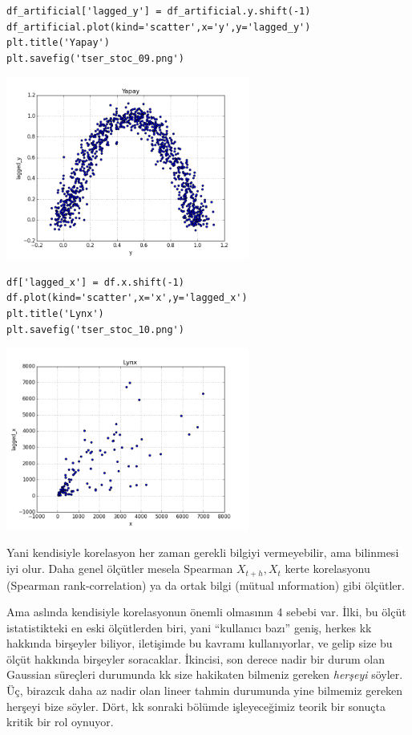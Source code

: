 \documentclass[12pt,fleqn]{article}\usepackage{../../common}
\begin{document}
\begin{verbatim}
df_artificial['lagged_y'] = df_artificial.y.shift(-1)
df_artificial.plot(kind='scatter',x='y',y='lagged_y')
plt.title('Yapay')
plt.savefig('tser_stoc_09.png')
\end{verbatim}

\includegraphics[height=6cm]{tser_stoc_09.png}

\begin{verbatim}
df['lagged_x'] = df.x.shift(-1)
df.plot(kind='scatter',x='x',y='lagged_x')
plt.title('Lynx')
plt.savefig('tser_stoc_10.png')
\end{verbatim}

\includegraphics[height=6cm]{tser_stoc_10.png}

Yani kendisiyle korelasyon her zaman gerekli bilgiyi vermeyebilir, ama bilinmesi
iyi olur. Daha genel ölçütler mesela Spearman $X_{t+h},X_t$ kerte korelasyonu
(Spearman rank-correlation) ya da ortak bilgi (mütual ınformation) gibi
ölçütler.

Ama aslında kendisiyle korelasyonun önemli olmasının 4 sebebi var. İlki, bu
ölçüt istatistikteki en eski ölçütlerden biri, yani ``kullanıcı bazı'' geniş,
herkes kk hakkında birşeyler biliyor, iletişimde bu kavramı kullanıyorlar, ve
gelip size bu ölçüt hakkında birşeyler soracaklar. İkincisi, son derece nadir
bir durum olan Gaussian süreçleri durumunda kk size hakikaten bilmeniz gereken
{\em herşeyi} söyler. Üç, birazcık daha az nadir olan lineer tahmin durumunda
yine bilmemiz gereken herşeyi bize söyler. Dört, kk sonraki bölümde
işleyeceğimiz teorik bir sonuçta kritik bir rol oynuyor.
\end{document}
